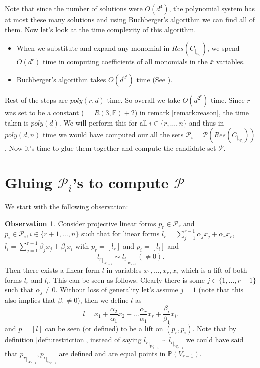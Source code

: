\documentclass[12pt]{caltech_thesis}
\theoremstyle{plain}
\theoremstyle{definition}
\newtheorem{observation}{Observation}
\newcommand{\F}{\mathbb{F}}
\newcommand{\MP}{\mathcal{P}}
\newcommand{\PP}{\mathbb{P}}
\newcommand{\B}[1]{\bar{#1}}
\begin{document}
Note that since the number of solutions were $O(d^4)$, the polynomial system has at most these many solutions and using
Buchberger's algorithm we can find all of them. Now let's look at the time complexity of this algorithm.
\begin{itemize}
\item When we substitute and expand any monomial in $Res(C_{|_{W_i}})$, we spend $ O(d^r)$
time in computing coefficients of all monomials in the $\B{x}$ variables.
\item Buchberger's algorithm takes $O(d^{2^r})$ time (See \cite{Buc76}).
 \end{itemize}
Rest of the steps are $poly(r,d)$ time. So overall we take $O(d^{2^r})$ time. Since $r$ was set to be a constant ( = $R(3,\F)+2$) 
in remark \ref{remark:reason}, the time taken is
$poly(d)$. We will perform this for all $i\in \{r,\ldots,n\}$ and thus in $poly(d,n)$ time we would have computed our all the  sets
$\MP_i = \MP(Res(C_{|_{W_i}}))$. Now it's time to glue them together and compute the candidate set $\MP$.


\section{Gluing $\MP_i$'s to compute $\MP$} \label{subsection:glueback}
We start with the following observation:

\begin{observation}
 Consider   projective linear forms $p_r\in \MP_r$ and $p_i \in \MP_i, i\in \{r+1,\ldots,n\}$ such that for 
 linear forms $l_r = \sum\limits_{j=1}^{r-1} \alpha_jx_j +\alpha_rx_r$, $l_i = \sum\limits_{j=1}^{r-1} \beta_jx_j + \beta_ix_i$ with 
 $p_r = [l_r]$ and $p_i=[l_i]$ and
 \[{l_r}_{|_{W_{r-1}}} \sim {l_i}_{|_{W_{r-1}}} (\neq 0).\]
 Then there exists a linear form $l$ in variables $x_1,\ldots,x_r,x_i$ which is a lift of both forms $l_r$ and $l_i$. This can be seen as follows. Clearly
 there is some $j\in \{1,\ldots,r-1\}$ such that $\alpha_j\neq 0$. Without loss of generality let's assume $j=1$ (note that this also
 implies that $\beta_1\neq 0$), then we define $l$ as
 \[
  l=x_1+\frac{\alpha_2}{\alpha_1}x_2 + \ldots \frac{\alpha_r}{\alpha_1}x_r + \frac{\beta_i}{\beta_1}x_i.
 \]
 and $p=[l]$ can be seen (or defined) to be a lift on $(p_r,p_i)$. Note that by definition \ref{defn:restriction}, instead 
 of saying ${l_r}_{|_{W_{r-1}}} \sim {l_i}_{|_{W_{r-1}}}$ we could have
 said that ${p_r}_{|_{W_{r-1}}}, {p_i}_{|_{W_{r-1}}}$ are defined and are equal points in $\PP(V_{r-1})$. 
\end{observation}
\end{document}
